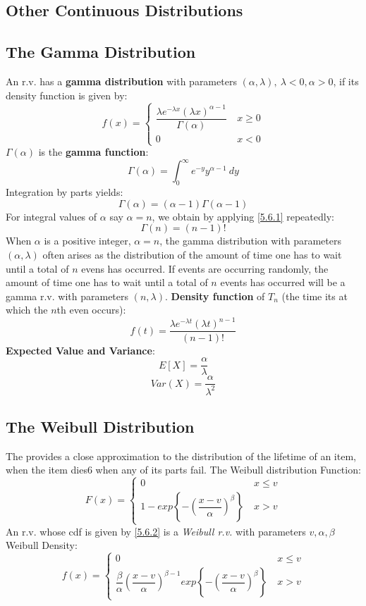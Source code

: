 \documentclass[openany]{book}
\numberwithin{equation}{section}
\begin{document}
\begin{flushleft}
\section{Other Continuous Distributions}
\subsection{The Gamma Distribution}
An r.v. has a \textbf{gamma distribution} with parameters $(\alpha,\lambda), \ \lambda<0, \alpha >0$, if its density function is given by:
\[f(x)=\begin{cases}
\dfrac{\lambda e^{-\lambda x}(\lambda x)^{\alpha -1}}{\Gamma(\alpha)} \ &x \geq 0\\
0 \ &x<0
\end{cases}
\]
$\Gamma(\alpha)$ is the \textbf{gamma function}:
\[\Gamma(\alpha)=\int_{0}^{\infty}e^{-y}y^{\alpha-1} \ dy
\]
Integration by parts yields:
\begin{equation}
\label{5.6.1}
\Gamma(\alpha)= (\alpha-1)\Gamma(\alpha-1)
\end{equation}
For integral values of $\alpha$ say $\alpha=n$, we obtain by applying \eqref{5.6.1} repeatedly:
\[\Gamma(n)=(n-1)!
\]
When $\alpha$ is a positive integer, $\alpha=n$, the gamma distribution with parameters $(\alpha,\lambda)$ often arises as the distribution of the amount of time one has to wait until a total of $n$ evens has occurred.\medbreak
If events are occurring randomly, the amount of time one has to wait until a total of $n$ events has occurred will be a gamma r.v. with parameters $(n,\lambda)$.\medbreak
\textbf{Density function} of $T_n$ (the time its at which the $n$th even occurs):
\[f(t)=\frac{\lambda e^{-\lambda t}(\lambda t)^{n-1}}{(n-1)!}
\]
\textbf{Expected Value and Variance}:
\[E[X]=\frac{\alpha}{\lambda}
\]
\[Var(X)= \frac{\alpha}{\lambda^2}
\]
\subsection{The Weibull Distribution}
The  provides a close approximation to the distribution of the lifetime
of an item, when the item dies6 when any of its parts fail.\medbreak
The Weibull distribution Function:
\begin{equation}
	\label{5.6.2}
F(x)=\begin{cases}
0 &x\leq v\\
1-exp \left\{-\left( \dfrac{x-v}{\alpha}\right)^\beta \right\} \ & x>v
\end{cases}
\end{equation}
An r.v. whose cdf is given by \eqref{5.6.2} is a \textit{Weibull r.v.} with parameters $v,\alpha,\beta$ \medbreak
Weibull Density:
\[f(x)= \begin{cases}
0 &x \leq v\\
\dfrac{\beta}{\alpha}\left(\dfrac{x-v}{\alpha} \right)^{\beta-1} exp \left\{-\left(\dfrac{x-v}{\alpha} \right)^\beta \right\} \ & x>v
\end{cases}
\]

\end{flushleft}
\end{document}
